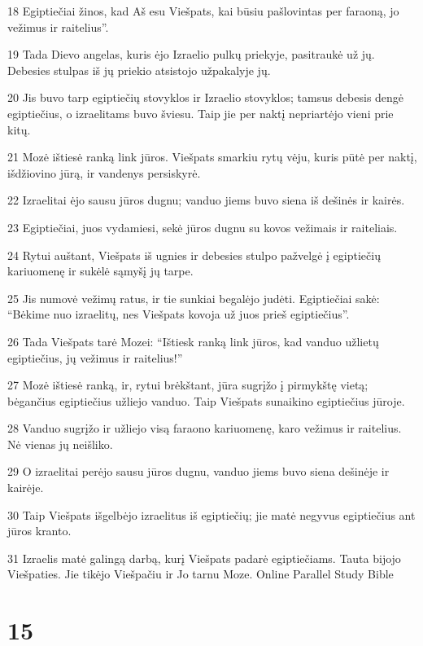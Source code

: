 \par 18 Egiptiečiai žinos, kad Aš esu Viešpats, kai būsiu pašlovintas per faraoną, jo vežimus ir raitelius”. 
\par 19 Tada Dievo angelas, kuris ėjo Izraelio pulkų priekyje, pasitraukė už jų. Debesies stulpas iš jų priekio atsistojo užpakalyje jų. 
\par 20 Jis buvo tarp egiptiečių stovyklos ir Izraelio stovyklos; tamsus debesis dengė egiptiečius, o izraelitams buvo šviesu. Taip jie per naktį nepriartėjo vieni prie kitų. 
\par 21 Mozė ištiesė ranką link jūros. Viešpats smarkiu rytų vėju, kuris pūtė per naktį, išdžiovino jūrą, ir vandenys persiskyrė. 
\par 22 Izraelitai ėjo sausu jūros dugnu; vanduo jiems buvo siena iš dešinės ir kairės. 
\par 23 Egiptiečiai, juos vydamiesi, sekė jūros dugnu su kovos vežimais ir raiteliais. 
\par 24 Rytui auštant, Viešpats iš ugnies ir debesies stulpo pažvelgė į egiptiečių kariuomenę ir sukėlė sąmyšį jų tarpe. 
\par 25 Jis numovė vežimų ratus, ir tie sunkiai begalėjo judėti. Egiptiečiai sakė: “Bėkime nuo izraelitų, nes Viešpats kovoja už juos prieš egiptiečius”. 
\par 26 Tada Viešpats tarė Mozei: “Ištiesk ranką link jūros, kad vanduo užlietų egiptiečius, jų vežimus ir raitelius!” 
\par 27 Mozė ištiesė ranką, ir, rytui brėkštant, jūra sugrįžo į pirmykštę vietą; bėgančius egiptiečius užliejo vanduo. Taip Viešpats sunaikino egiptiečius jūroje. 
\par 28 Vanduo sugrįžo ir užliejo visą faraono kariuomenę, karo vežimus ir raitelius. Nė vienas jų neišliko. 
\par 29 O izraelitai perėjo sausu jūros dugnu, vanduo jiems buvo siena dešinėje ir kairėje. 
\par 30 Taip Viešpats išgelbėjo izraelitus iš egiptiečių; jie matė negyvus egiptiečius ant jūros kranto. 
\par 31 Izraelis matė galingą darbą, kurį Viešpats padarė egiptiečiams. Tauta bijojo Viešpaties. Jie tikėjo Viešpačiu ir Jo tarnu Moze.
Online Parallel Study Bible



\chapter{15}


